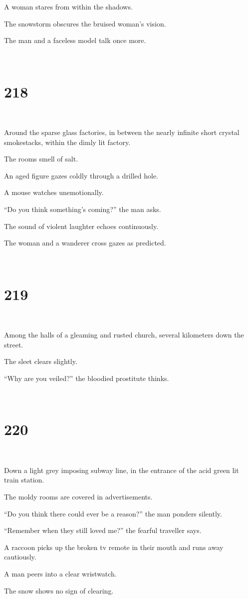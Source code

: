 \documentclass{report}
\begin{document}
A woman stares from within the shadows.

The snowstorm obscures the bruised woman's vision.

The man and a faceless model talk once more.

~
\chapter*{218}
~

Around the sparse glass factories, in between the nearly infinite short crystal smokestacks, within the dimly lit factory.

The rooms smell of salt.

An aged figure gazes coldly through a drilled hole.

A mouse watches unemotionally.

``Do you think something's coming?'' the man asks.

The sound of violent laughter echoes continuously.

The woman and a wanderer cross gazes as predicted.

~
\chapter*{219}
~

Among the halls of a gleaming and rusted church, several kilometers down the street.

The sleet clears slightly.

``Why are you veiled?'' the bloodied prostitute thinks.

~
\chapter*{220}
~

Down a light grey imposing subway line, in the entrance of the acid green lit train station.

The moldy rooms are covered in advertisements.

``Do you think there could ever be a reason?'' the man ponders silently.

``Remember when they still loved me?'' the fearful traveller says.

A raccoon picks up the broken tv remote in their mouth and runs away cautiously.

A man peers into a clear wristwatch.

The snow shows no sign of clearing.
\end{document}
